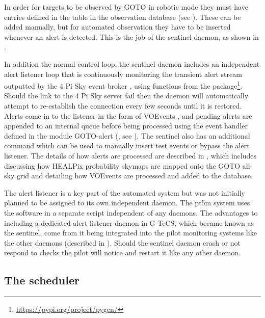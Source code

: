 \begin{colsection}
\begin{colsection}
In order for targets to be observed by GOTO in robotic mode they must have entries defined in the  table in the observation database (see ). These can be added manually, but for automated observation they have to be inserted whenever an alert is detected. This is the job of the sentinel daemon, as shown in .

In addition the normal control loop, the sentinel daemon includes an independent alert listener loop that is continuously monitoring the transient alert stream outputted by the 4 Pi Sky event broker \citep{4pisky}, using functions from the   package\footnote{\url{https://pypi.org/project/pygcn/}}. Should the link to the 4 Pi Sky server fail then the daemon will automatically attempt to re-establish the connection every few seconds until it is restored. Alerts come in to the listener in the form of VOEvents \citep{voevent}, and pending alerts are appended to an internal queue before being processed using the event handler defined in the  module GOTO-alert (, see ). The sentinel also has an additional  command which can be used to manually insert test events or bypass the alert listener. The details of how alerts are processed are described in , which includes  discussing how HEALPix probability skymaps are mapped onto the GOTO all-sky grid and  detailing how VOEvents are processed and added to the database.

The alert listener is a key part of the automated system but was not initially planned to be assigned to its own independent daemon. The \gls{pt5m} system uses the  software \citep{comet} in a separate script independent of any daemons. The advantages to including a dedicated alert listener daemon in G-TeCS, which became known as the sentinel, come from it being integrated into the pilot monitoring systems like the other daemons (described in ). Should the sentinel daemon crash or not respond to checks the pilot will notice and restart it like any other daemon.

\end{colsection}


\subsection{The scheduler}
\label{sec:scheduler}
\begin{colsection}


\end{colsection}
\end{colsection}
